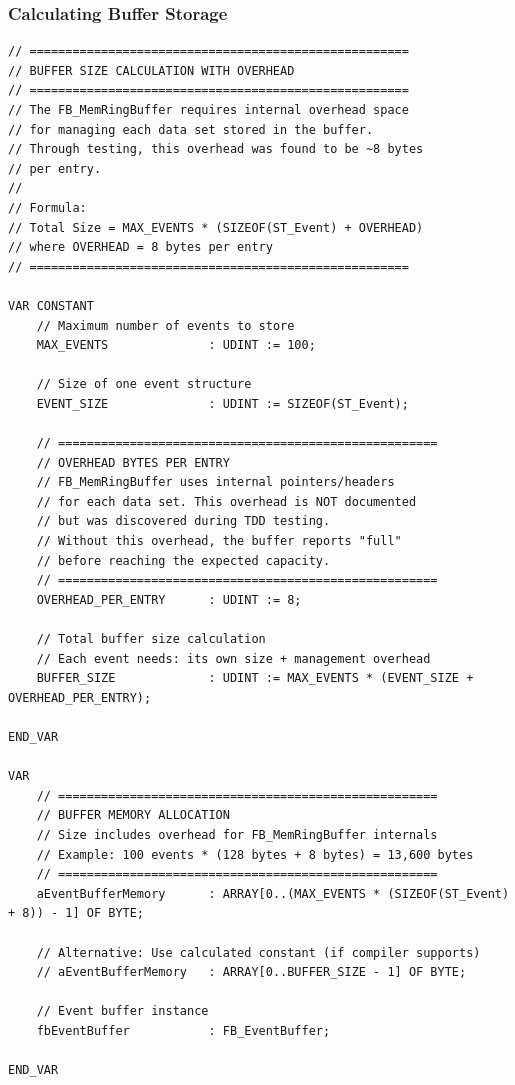 \documentclass[11pt,a4paper]{article}
\begin{document}
\subsubsection*{Calculating Buffer Storage}

\begin{lstlisting}
// =====================================================
// BUFFER SIZE CALCULATION WITH OVERHEAD
// =====================================================
// The FB_MemRingBuffer requires internal overhead space
// for managing each data set stored in the buffer.
// Through testing, this overhead was found to be ~8 bytes
// per entry.
//
// Formula:
// Total Size = MAX_EVENTS * (SIZEOF(ST_Event) + OVERHEAD)
// where OVERHEAD = 8 bytes per entry
// =====================================================

VAR CONSTANT
    // Maximum number of events to store
    MAX_EVENTS              : UDINT := 100;
    
    // Size of one event structure
    EVENT_SIZE              : UDINT := SIZEOF(ST_Event);
    
    // =====================================================
    // OVERHEAD BYTES PER ENTRY
    // FB_MemRingBuffer uses internal pointers/headers
    // for each data set. This overhead is NOT documented
    // but was discovered during TDD testing.
    // Without this overhead, the buffer reports "full"
    // before reaching the expected capacity.
    // =====================================================
    OVERHEAD_PER_ENTRY      : UDINT := 8;
    
    // Total buffer size calculation
    // Each event needs: its own size + management overhead
    BUFFER_SIZE             : UDINT := MAX_EVENTS * (EVENT_SIZE + OVERHEAD_PER_ENTRY);
    
END_VAR

VAR
    // =====================================================
    // BUFFER MEMORY ALLOCATION
    // Size includes overhead for FB_MemRingBuffer internals
    // Example: 100 events * (128 bytes + 8 bytes) = 13,600 bytes
    // =====================================================
    aEventBufferMemory      : ARRAY[0..(MAX_EVENTS * (SIZEOF(ST_Event) + 8)) - 1] OF BYTE;
    
    // Alternative: Use calculated constant (if compiler supports)
    // aEventBufferMemory   : ARRAY[0..BUFFER_SIZE - 1] OF BYTE;
    
    // Event buffer instance
    fbEventBuffer           : FB_EventBuffer;
    
END_VAR
\end{lstlisting}
\end{document}
